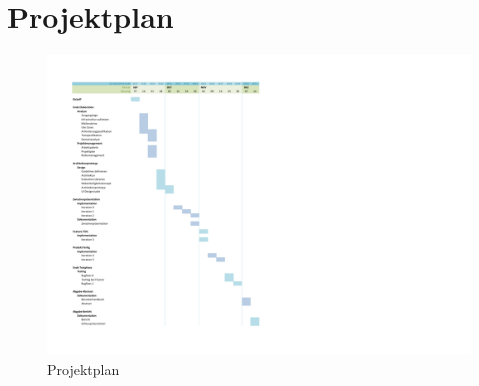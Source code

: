 \section{Projektplan}
\label{sec:Projektplan}

\begin{figure}[H]
    \begin{center}
        \includegraphics[trim=30 30 0 50]{projectmanagement/res/projektplan}
    \end{center}
    \caption{Projektplan}
\end{figure}